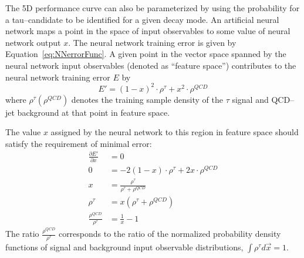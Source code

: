 The 5D performance curve can also be parameterized by using the probability for
a tau--candidate to be identified for a given decay mode.  
An artificial neural network maps a point in the space of input observables to
some value of neural network output $x$.  The neural network training error is
given by Equation~\ref{eq:NNerrorFunc}.  A given point in the vector space
spanned by the neural network input observables (denoted as ``feature space'')
contributes to the neural network training error $E$ by 
\begin{equation}
   E' = (1 - x)^2\cdot\rho^\tau + x^2\cdot\rho^{QCD}
   \nonumber
\end{equation}
where $\rho^\tau (\rho^{QCD})$ denotes the training sample density of the
$\tau$ signal and QCD--jet background at that point in feature space.

The value $x$ assigned by the neural network to this region in feature space
should satisfy the requirement of minimal error:
\begin{align}
   \frac{\partial E'}{\partial x} &= 0 \nonumber \\ 
   0 &= -2(1-x)\cdot\rho^\tau+2x\cdot\rho^{QCD} \nonumber \\ 
   x &= \frac{\rho^\tau} {\rho^\tau + \rho^{QCD}} \label{eq:probFracToX} \\ 
   \rho^\tau &= x(\rho^\tau + \rho^{QCD}) \nonumber \\ 
   \frac{\rho^{QCD}}{\rho^\tau} &= \frac{1}{x} - 1  \label{eq:rawTransformX}
\end{align}
The ratio $\frac{\rho^{QCD}}{\rho^\tau}$ corresponds to the ratio of
the normalized probability density functions of signal and background input
observable distributions, \ie $\int \rho^{\tau} d\vec x = 1$.

